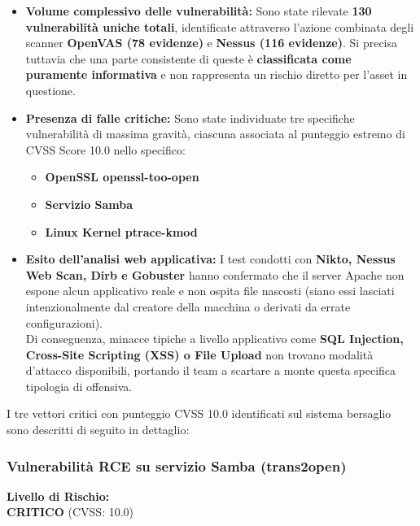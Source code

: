 \documentclass[12pt, a4paper]{article}
\begin{document}
	\begin{itemize}
		\item \textbf{Volume complessivo delle vulnerabilità:} Sono state rilevate \textbf{130 vulnerabilità uniche totali}, identificate attraverso l'azione combinata degli scanner \textbf{OpenVAS (78 evidenze)} e \textbf{Nessus (116 evidenze)}. Si precisa tuttavia che una parte consistente di queste è \textbf{classificata come puramente informativa} e non rappresenta un rischio diretto per l'asset in questione.
		\item \textbf{Presenza di falle critiche:} Sono state individuate tre specifiche vulnerabilità di massima gravità, ciascuna associata al punteggio estremo di CVSS Score 10.0 
		nello specifico: 
		\begin{itemize}
			\item[*] \textbf{OpenSSL openssl-too-open}
			\item[*] \textbf{Servizio Samba}
			\item[*] \textbf{Linux Kernel ptrace-kmod}
		\end{itemize}
		\item \textbf{Esito dell'analisi web applicativa:} I test condotti con \textbf{Nikto, Nessus Web Scan, Dirb e Gobuster} hanno confermato che il server Apache non espone alcun applicativo reale e non ospita file nascosti (siano essi lasciati intenzionalmente dal creatore della macchina o derivati da errate configurazioni).\\ 
		Di conseguenza, minacce tipiche a livello applicativo come \textbf{SQL Injection, Cross-Site Scripting (XSS) o File Upload} non trovano modalità d'attacco disponibili, portando il team a scartare a monte questa specifica tipologia di offensiva.
	\end{itemize}


	\newpage
	I tre vettori critici con punteggio CVSS 10.0 identificati sul sistema bersaglio sono descritti di seguito in dettaglio:
    \vspace{0.5cm}
    
    \subsubsection{Vulnerabilità RCE su servizio Samba (trans2open)}
    \textbf{Livello di Rischio:} \\ \vspace{0.15cm}
    {\color{red}\textbf{CRITICO}} (CVSS: 10.0)
    \vspace{0.5 cm}
\end{document}
